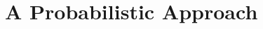 \documentclass[main.tex]{subfiles}
\begin{document}
\section{A Probabilistic Approach} \label{section:ppm_initial}

\end{document}
